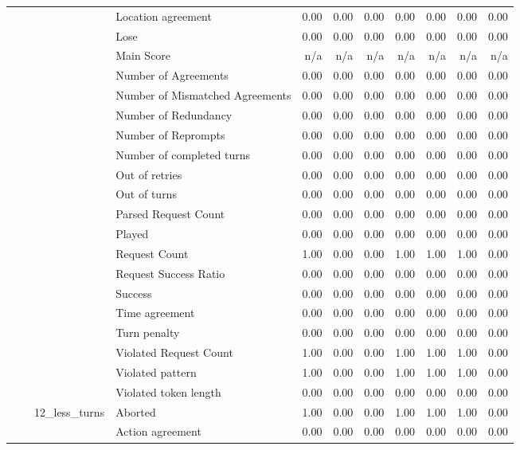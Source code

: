 \begin{tabular}{llllrrrrrrr}
 &  &  & Location agreement & 0.00 & 0.00 & 0.00 & 0.00 & 0.00 & 0.00 & 0.00 \\
 &  &  & Lose & 0.00 & 0.00 & 0.00 & 0.00 & 0.00 & 0.00 & 0.00 \\
 &  &  & Main Score & n/a & n/a & n/a & n/a & n/a & n/a & n/a \\
 &  &  & Number of Agreements & 0.00 & 0.00 & 0.00 & 0.00 & 0.00 & 0.00 & 0.00 \\
 &  &  & Number of Mismatched Agreements & 0.00 & 0.00 & 0.00 & 0.00 & 0.00 & 0.00 & 0.00 \\
 &  &  & Number of Redundancy & 0.00 & 0.00 & 0.00 & 0.00 & 0.00 & 0.00 & 0.00 \\
 &  &  & Number of Reprompts & 0.00 & 0.00 & 0.00 & 0.00 & 0.00 & 0.00 & 0.00 \\
 &  &  & Number of completed turns & 0.00 & 0.00 & 0.00 & 0.00 & 0.00 & 0.00 & 0.00 \\
 &  &  & Out of retries & 0.00 & 0.00 & 0.00 & 0.00 & 0.00 & 0.00 & 0.00 \\
 &  &  & Out of turns & 0.00 & 0.00 & 0.00 & 0.00 & 0.00 & 0.00 & 0.00 \\
 &  &  & Parsed Request Count & 0.00 & 0.00 & 0.00 & 0.00 & 0.00 & 0.00 & 0.00 \\
 &  &  & Played & 0.00 & 0.00 & 0.00 & 0.00 & 0.00 & 0.00 & 0.00 \\
 &  &  & Request Count & 1.00 & 0.00 & 0.00 & 1.00 & 1.00 & 1.00 & 0.00 \\
 &  &  & Request Success Ratio & 0.00 & 0.00 & 0.00 & 0.00 & 0.00 & 0.00 & 0.00 \\
 &  &  & Success & 0.00 & 0.00 & 0.00 & 0.00 & 0.00 & 0.00 & 0.00 \\
 &  &  & Time agreement & 0.00 & 0.00 & 0.00 & 0.00 & 0.00 & 0.00 & 0.00 \\
 &  &  & Turn penalty & 0.00 & 0.00 & 0.00 & 0.00 & 0.00 & 0.00 & 0.00 \\
 &  &  & Violated Request Count & 1.00 & 0.00 & 0.00 & 1.00 & 1.00 & 1.00 & 0.00 \\
 &  &  & Violated pattern & 1.00 & 0.00 & 0.00 & 1.00 & 1.00 & 1.00 & 0.00 \\
 &  &  & Violated token length & 0.00 & 0.00 & 0.00 & 0.00 & 0.00 & 0.00 & 0.00 \\
\cline{3-11}
 &  & \multirow[t]{27}{*}{12_less_turns} & Aborted & 1.00 & 0.00 & 0.00 & 1.00 & 1.00 & 1.00 & 0.00 \\
 &  &  & Action agreement & 0.00 & 0.00 & 0.00 & 0.00 & 0.00 & 0.00 & 0.00 \\

\end{tabular}
